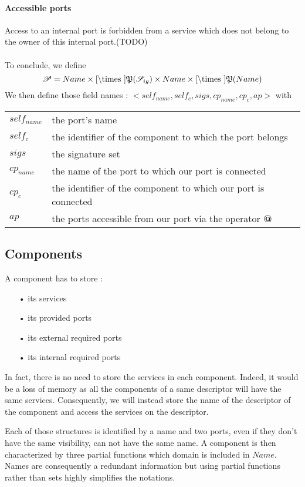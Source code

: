 \paragraph{Accessible ports}
Access to an internal port is forbidden from a service which does not belong to the owner of this internal port.(TODO)

\paragraph{}

To conclude, we define
\[\Po = Name \times \Cref \times \mathfrak{P}(\Sig)\times Name \times \Cref \times \mathfrak{P}(Name)\]
We then define those field names : $<self_{name}, self_c,sigs,cp_{name},cp_{c},ap>$ with

\begin{tabular}{ll}
$self_{name}$ & the port's name\\
$self_c$ & the identifier of the component to which the port belongs\\
$sigs$ & the signature set\\
$cp_{name}$ &  the name of the port to which our port is connected \\
$cp_c$ & the identifier of the component to which our port is connected \\
$ap$ & the ports accessible from our port via the operator \textbf{@}
\end{tabular}



\subsection{Components}
\label{component_value}
A component has to store :
\begin{itemize}
\item[•] its services
\item[•] its provided ports
\item[•] its external required ports
\item[•] its internal required ports
\end{itemize}

In fact, there is no need to store the services in each component. Indeed, it would be a loss of memory as all the components of a same descriptor will have the same services. Consequently, we will instead store the name of the descriptor of the component and access the services on the descriptor.

Each of those structures is identified by a name and two ports, even if they don't have the same visibility, can not have the same name. A component is then characterized by three partial functions which domain is included in $Name$. Names are consequently a redundant information but using partial functions rather than sets highly simplifies  the notations.

